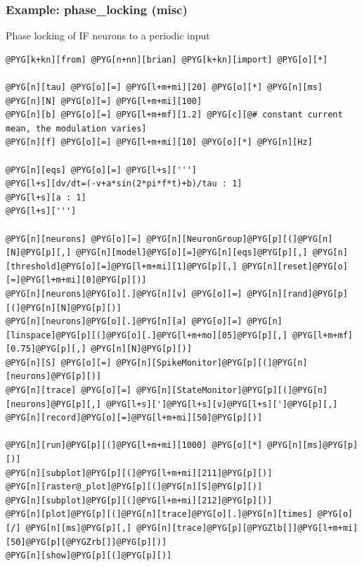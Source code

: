 \documentclass[letterpaper,10pt,english]{manual}
\begin{document}
\resetcurrentobjects
\hypertarget{--doc-examples-misc_phase_locking}{}

\hypertarget{index-58}{}\subsubsection{Example: phase\_locking (misc)}

Phase locking of IF neurons to a periodic input

\begin{Verbatim}[commandchars=@\[\]]
@PYG[k+kn][from] @PYG[n+nn][brian] @PYG[k+kn][import] @PYG[o][*]

@PYG[n][tau] @PYG[o][=] @PYG[l+m+mi][20] @PYG[o][*] @PYG[n][ms]
@PYG[n][N] @PYG[o][=] @PYG[l+m+mi][100]
@PYG[n][b] @PYG[o][=] @PYG[l+m+mf][1.2] @PYG[c][@# constant current mean, the modulation varies]
@PYG[n][f] @PYG[o][=] @PYG[l+m+mi][10] @PYG[o][*] @PYG[n][Hz]

@PYG[n][eqs] @PYG[o][=] @PYG[l+s][''']
@PYG[l+s][dv/dt=(-v+a*sin(2*pi*f*t)+b)/tau : 1]
@PYG[l+s][a : 1]
@PYG[l+s][''']

@PYG[n][neurons] @PYG[o][=] @PYG[n][NeuronGroup]@PYG[p][(]@PYG[n][N]@PYG[p][,] @PYG[n][model]@PYG[o][=]@PYG[n][eqs]@PYG[p][,] @PYG[n][threshold]@PYG[o][=]@PYG[l+m+mi][1]@PYG[p][,] @PYG[n][reset]@PYG[o][=]@PYG[l+m+mi][0]@PYG[p][)]
@PYG[n][neurons]@PYG[o][.]@PYG[n][v] @PYG[o][=] @PYG[n][rand]@PYG[p][(]@PYG[n][N]@PYG[p][)]
@PYG[n][neurons]@PYG[o][.]@PYG[n][a] @PYG[o][=] @PYG[n][linspace]@PYG[p][(]@PYG[o][.]@PYG[l+m+mo][05]@PYG[p][,] @PYG[l+m+mf][0.75]@PYG[p][,] @PYG[n][N]@PYG[p][)]
@PYG[n][S] @PYG[o][=] @PYG[n][SpikeMonitor]@PYG[p][(]@PYG[n][neurons]@PYG[p][)]
@PYG[n][trace] @PYG[o][=] @PYG[n][StateMonitor]@PYG[p][(]@PYG[n][neurons]@PYG[p][,] @PYG[l+s][']@PYG[l+s][v]@PYG[l+s][']@PYG[p][,] @PYG[n][record]@PYG[o][=]@PYG[l+m+mi][50]@PYG[p][)]

@PYG[n][run]@PYG[p][(]@PYG[l+m+mi][1000] @PYG[o][*] @PYG[n][ms]@PYG[p][)]
@PYG[n][subplot]@PYG[p][(]@PYG[l+m+mi][211]@PYG[p][)]
@PYG[n][raster@_plot]@PYG[p][(]@PYG[n][S]@PYG[p][)]
@PYG[n][subplot]@PYG[p][(]@PYG[l+m+mi][212]@PYG[p][)]
@PYG[n][plot]@PYG[p][(]@PYG[n][trace]@PYG[o][.]@PYG[n][times] @PYG[o][/] @PYG[n][ms]@PYG[p][,] @PYG[n][trace]@PYG[p][@PYGZlb[]]@PYG[l+m+mi][50]@PYG[p][@PYGZrb[]]@PYG[p][)]
@PYG[n][show]@PYG[p][(]@PYG[p][)]
\end{Verbatim}
\end{document}
